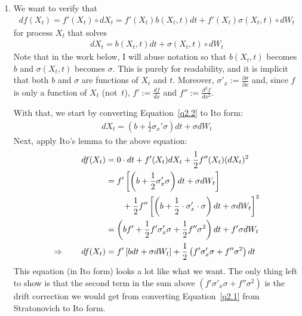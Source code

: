 \documentclass[12pt]{article}
\theoremstyle{plain}
\theoremstyle{definition}
\theoremstyle{remark}
\begin{document}
\begin{enumerate}
  \item %
    We want to verify that
    \begin{align}
      df(X_t) = f'(X_t) \circ dX_t =
      f'(X_t) b(X_t,t) dt + f'(X_t) \sigma(X_t,t) \circ dW_t
      \label{q2.1}
    \end{align}
    for process $X_t$ that solves
    \begin{align}
      \label{q2.2}
      dX_t = b(X_t,t) dt + \sigma(X_t,t)\circ dW_t
    \end{align}
    Note that in the work below, I will abuse notation so that
    $b(X_t,t)$ becomes $b$ and $\sigma(X_t,t)$ becomes $\sigma$. This is
    purely for readability, and it is implicit that both $b$ and
    $\sigma$ are functions of $X_t$ and $t$. Moreover,
    $\sigma'_x:=\frac{\partial\sigma}{\partial x}$ and, since $f$ is
    only a function of $X_t$ (not~$t$), $f':=\frac{df}{dx}$
    and $f'':=\frac{d^2f}{dx^2}$.

    With that, we start by converting Equation~\ref{q2.2} to Ito form:
    \begin{align*}
      dX_t = \left( b + \frac{1}{2} \sigma_x' \sigma
        \right) dt
        + \sigma dW_t
    \end{align*}
    Next, apply Ito's lemma to the above equation:
    \begin{align}
      df(X_t) &=
      0 \cdot dt
      + f'(X_t) dX_t
      + \frac{1}{2} f''(X_t) (dX_t)^2\notag\\
      &=
      f'
        \left[
          \left(
          b + \frac{1}{2} \sigma_x' \sigma
          \right)
        dt
        + \sigma dW_t
      \right]\notag\\
      &\qquad
      + \frac{1}{2} f''
      \left[\left( b + \frac{1}{2}\cdot
        \sigma_x' \cdot \sigma
        \right) dt
      + \sigma dW_t\right]^2\notag\\
      &= \left(
      b f'
      + \frac{1}{2} f' \sigma'_x \sigma
        + \frac{1}{2} f'' \sigma^2
        \right) dt
        + f' \sigma dW_t\notag\\
      \Rightarrow \qquad
      df(X_t)
      &= f' \left[ b dt + \sigma dW_t\right]
        + \frac{1}{2}
          \left( f' \sigma'_x \sigma +  f'' \sigma^2\right) dt
          \label{q2.3}
    \end{align}
    This equation (in Ito form) looks a lot like what we want. The only
    thing left to show is that the second term in the sum above $\left(
    f' \sigma'_x \sigma +  f'' \sigma^2\right)$ is the drift correction
    we would get from converting Equation~\ref{q2.1} from Stratonovich
    to Ito form.


\end{enumerate}
\end{document}
